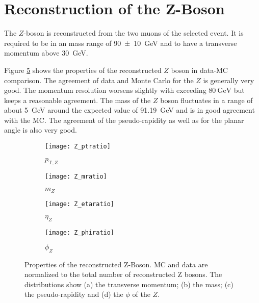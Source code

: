 \section{Reconstruction of the Z-Boson}

The $Z$-boson is reconstructed from the two muons of the selected event.
It is required to be in an mass range of \SI{90+-10}{\GeV} and to have a transverse momentum above \SI{30}{\GeV}.

Figure \ref{fig:z} shows the properties of the reconstructed $Z$ boson in data-MC comparison. The agreement of data and Monte Carlo for the $Z$ is generally very good. The momentum resolution worsens slightly with \pT exceeding $\SI{80}{\GeV}$ but keeps a reasonable agreement. The mass of the $Z$ boson fluctuates in a range of about \SI{5}{\GeV} around the expected value of \SI{91.19}{\GeV} and is in good agreement with the MC.
The agreement of the pseudo-rapidity as well as for the planar angle is also very good.


\begin{figure}[h]
\centering
\begin{subfigure}[b]{0.5\figwidth}
\texttt{[image: Z\_ptratio]}
\caption[Transverse momentum of the reconstructed Z]{\ensuremath{p_{\text{T}, Z}}\xspace}
\label{fig:zpt}
\end{subfigure}
\quad
\begin{subfigure}[b]{0.5\figwidth}
\texttt{[image: Z\_mratio]}
\caption[mass of the reconstructed $Z$]{$m_Z$}
\label{fig:zm}
\end{subfigure}


\begin{subfigure}[b]{0.5\figwidth}
\texttt{[image: Z\_etaratio]}
\caption[$\eta$ of the reconstructed $Z$]{$\eta_Z$}
\label{fig:zeta}
\end{subfigure}
\quad
\begin{subfigure}[b]{0.5\figwidth}
\texttt{[image: Z\_phiratio]}
\caption[$\phi$ of the reconstructed $Z$]{$\phi_Z$}
\label{fig:zphi}
\end{subfigure}
\caption{Properties of the reconstructed Z-Boson. MC and data are normalized to the total number of reconstructed Z bosons. The distributions show (a) the transverse momentum; (b) the mass; (c) the pseudo-rapidity and (d) the $\phi$ of the $Z$.}
\label{fig:z}
\end{figure}

